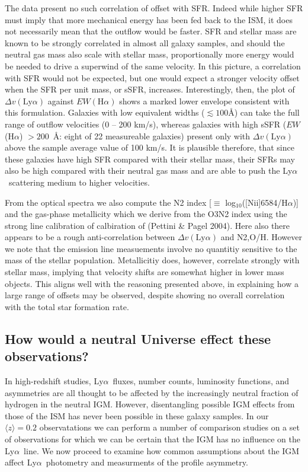 \documentclass[manuscript]{emulateapj}
\newcommand{\lya}{Ly$\alpha$}
\newcommand{\ha}{H$\alpha$}
\newcommand{\nII}{[N{\sc ii}]}
\begin{document}
The data present no such correlation of offset with SFR. Indeed while 
higher SFR must imply that more mechanical energy has been fed back to 
the ISM, it does not necessarily mean that the outflow would be faster. 
SFR and stellar mass are known to be strongly correlated 
in almost all galaxy samples, and should the neutral gas mass also scale
with stellar mass, proportionally more energy would be needed 
to drive a superwind of the same velocity. In this picture, a correlation 
with SFR would not be expected, but one would expect a stronger velocity 
offset when the SFR per unit mass, or sSFR, increases. Interestingly, then, 
the plot of $\Delta v(\mathrm{Ly}\alpha)$ against $EW(\mathrm{H}\alpha)$ shows 
a marked lower envelope consistent with this formulation. Galaxies with low 
equivalent widths ($\lesssim 100$\AA) can 
take the full range of outflow velocities (0 -- 200 km/s), whereas galaxies with
high sSFR ($EW$(\ha) $>200$~\AA: eight of 22 measureable galaxies) present only 
with $\Delta v(\mathrm{Ly}\alpha)$ 
above the sample average value of 100 km/s.  It is plausible
therefore, that since these galaxies have high SFR compared with their stellar mass, 
their SFRs may also be high compared with their neutral gas mass and are able to
push the \lya\ scattering medium to higher velocities. 

From the optical spectra we also compute the N2 index 
[$\equiv$ log$_{10}$(\nII6584/\ha)] and the gas-phase metallicity which we derive 
from the O3N2 index using the strong line calibration of calbiration of 
(Pettini \& Pagel 2004). Here also there appears to be a rough anti-correlation 
between $\Delta v(\mathrm{Ly}\alpha)$ and {N2,O/H}. However we note that the 
emission line measuements involve no quantitiy sensitive to the mass of the stellar 
population. Metallicitiy does, however, correlate strongly with stellar mass, 
implying that velocity shifts are somewhat higher in lower mass objects. 
This aligns well with the reasoning presented above, in explaining how a large 
range of offsets may be observed, despite showing no overall correlation with 
the total star formation rate. 


\subsection{How would a neutral Universe effect these observations?}

In high-redshift studies, \lya\ fluxes, number counts, luminosity functions, 
and asymmetries are all thought to be affected by the increasingly neutral 
fraction of hydrogen in the neutral IGM. However, disentangling possible IGM
effects from those of the ISM has never been possible in these galaxy samples. 
In our $\langle z\rangle=0.2$ observatations we can perform a number of 
comparison studies on a set of observations for which we can be certain that 
the IGM has no influence on the \lya\ line. We now proceed to examine how 
common assumptions about the IGM affect \lya\ photometry and measurments of the 
profile asymmetry. 
\end{document}
